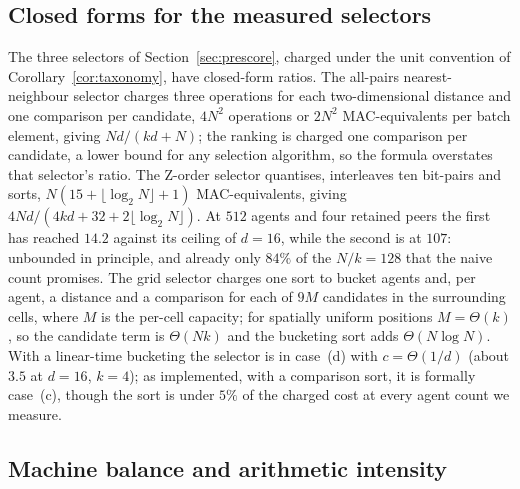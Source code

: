 \subsection{Closed forms for the measured selectors}
\label{app:closedforms}

The three selectors of Section~\ref{sec:prescore}, charged under the unit
convention of Corollary~\ref{cor:taxonomy}, have closed-form ratios. The
all-pairs nearest-neighbour selector charges three operations for each
two-dimensional distance and one comparison per candidate, $4N^2$ operations or
$2N^2$ MAC-equivalents per batch element, giving $Nd/(kd + N)$; the ranking is
charged one comparison per candidate, a lower bound for any selection algorithm,
so the formula overstates that selector's ratio. The Z-order selector
quantises, interleaves ten bit-pairs and sorts, $N(15 + \lfloor \log_2 N
\rfloor + 1)$ MAC-equivalents, giving
$4Nd/(4kd + 32 + 2\lfloor \log_2 N\rfloor)$. At $512$ agents and four retained
peers the first has reached $14.2$ against its ceiling of $d = 16$, while the
second is at $107$: unbounded in principle, and already only $84\%$ of the
$N/k = 128$ that the naive count promises. The grid selector charges one sort to
bucket agents and, per agent, a distance and a comparison for each of $9M$
candidates in the surrounding cells, where $M$ is the per-cell capacity; for spatially uniform positions $M = \Theta(k)$, so the candidate term is
$\Theta(Nk)$ and the bucketing sort adds $\Theta(N \log N)$. With a linear-time
bucketing the selector is in case~(d) with $c = \Theta(1/d)$ (about $3.5$ at
$d{=}16$, $k{=}4$); as implemented, with a comparison sort, it is formally
case~(c), though the sort is under $5\%$ of the charged cost at every agent
count we measure.

\subsection{Machine balance and arithmetic intensity}
\label{app:intensity}

